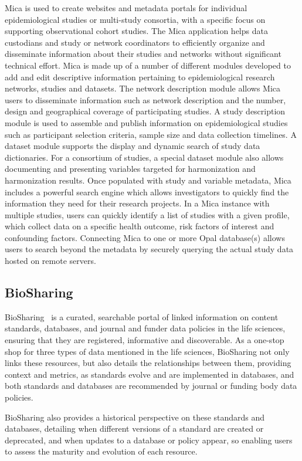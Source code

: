 Mica is used to create websites and metadata portals for individual epidemiological
studies or multi-study consortia, with a specific focus on supporting observational
cohort studies.
The Mica application helps data custodians and study or network coordinators to
efficiently organize and disseminate information about their studies and networks
without significant technical effort.
Mica is made up of a number of different modules developed to add and edit descriptive
information pertaining to epidemiological research networks, studies and datasets.
The network description module allows Mica users to disseminate information such as
network description and the number, design and geographical coverage of participating
studies.
A study description module is used to assemble and publish information on
epidemiological studies such as participant selection criteria, sample size and data
collection timelines.
A dataset module supports the display and dynamic search of study data dictionaries.
For a consortium of studies, a special dataset module also allows documenting and
presenting variables targeted for harmonization and harmonization results.
Once populated with study and variable metadata, Mica includes a powerful search engine
which allows investigators to quickly find the information they need for their research
projects.
In a Mica instance with multiple studies, users can quickly identify a list of studies
with a given profile, which collect data on a specific health outcome, risk factors of
interest and confounding factors.
Connecting Mica to one or more Opal database(s) allows users to search beyond the metadata by securely querying the actual
study data hosted on remote servers.


\subsection*{BioSharing}
BioSharing~\cite{biosharing} is a curated, searchable portal of linked information on content standards,
databases, and journal and funder data policies in the life sciences, ensuring that
they are registered, informative and discoverable.
As a one-stop shop for three types of data mentioned in the life sciences, BioSharing not only links these resources, but also details the relationships between them, providing context and metrics, as standards evolve and are implemented in databases, and both standards and databases are recommended by journal or funding body data policies.

BioSharing also provides a historical perspective on these standards and databases,
detailing when different versions of a standard are created or deprecated, and when
updates to a database or policy appear, so enabling users to assess the maturity and
evolution of each resource.

